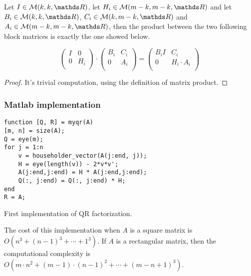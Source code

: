 \documentclass[computationalMathematics.tex]{subfiles}
\begin{document}
\begin{theorem}
  Let $I \in \mathcal{M}(k, k, \R)$, let $H_{i} \in \mathcal{M}(m-k, m-k, \R)$ and let $B_{i} \in \mathcal{M}(k, k, \R)$, $C_{i} \in \mathcal{M}(k, m-k, \R)$ and $A_{i} \in \mathcal{M}(m-k, m-k, \R)$, then the product between the two following block matrices is exactly the one showed below.

\[\begin{pmatrix}
    I & 0\\
    0 & H_{i}\\
  \end{pmatrix}
  \cdot 
  \begin{pmatrix}
    B_{i} & C_{i}\\
    0 & A_{i}\\
  \end{pmatrix}
  = 
  \begin{pmatrix}
    B_{i}I & C_{i}\\
    0 & H_{i} \cdot A_{i}\\
  \end{pmatrix}
\]
\end{theorem}

\begin{proof}
  It's trivial computation, using the definition of matrix product.
\end{proof}

\subsubsection{Matlab implementation}

\begin{center}
\begin{minipage}{.9\linewidth}
\begin{algorithm}[H]
\begin{verbatim}
function [Q, R] = myqr(A)
[m, n] = size(A);
Q = eye(m);
for j = 1:n
    v = householder_vector(A(j:end, j));
    H = eye(length(v)) - 2*v*v';
    A(j:end,j:end) = H * A(j:end,j:end);
    Q(:, j:end) = Q(:, j:end) * H;
end
R = A;
\end{verbatim}
  \label{alg:26ottQR1}
\caption{First implementation of QR factorization.}
\end{algorithm}
\end{minipage}
\end{center}

\begin{proposition}
  The cost of this implementation when $A$ is a square matrix is $O(n^{3} + {(n-1)}^{3} + \cdots + 1^{3})$. If $A$ is a rectangular matrix, then the computational complexity is $O(m \cdot n^{2} + {(m-1) \cdot (n-1)}^{2} + \cdots + {(m - n + 1)}^{3})$.
\end{proposition}
\end{document}
